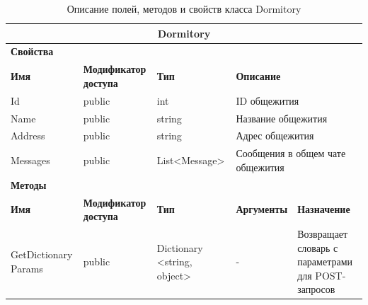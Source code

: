 \documentclass{../includes/TechDoc}
\begin{document}
    \begin{table}[ht]
        \caption{\label{tab:class-dormitory-table}Описание полей, методов и свойств класса Dormitory}
        \centering
        \begin{tabular}{|p{3cm}|p{3cm}|p{3cm}|p{2.6cm}|p{4cm}|}
            \hline
            \multicolumn{5}{|c|}{Dormitory} \\ \hline
            \multicolumn{5}{|l|}{\textbf{Свойства}} \\ \hline
            \textbf{Имя} & \textbf{Модификатор доступа} & \textbf{Тип} & \multicolumn{2}{p{6.9cm}|}{\textbf{Описание}} \\ \hline
            Id & public & int & \multicolumn{2}{p{6.9cm}|}{ID общежития} \\ \hline
            Name & public & string & \multicolumn{2}{p{6.9cm}|}{Название общежития} \\ \hline
            Address & public & string & \multicolumn{2}{p{6.9cm}|}{Адрес общежития} \\ \hline
            Messages & public & List<Message> & \multicolumn{2}{p{6.9cm}|}{Сообщения в общем чате общежития} \\ \hline
            \multicolumn{5}{|l|}{\textbf{Методы}} \\ \hline
            \textbf{Имя} & \textbf{Модификатор доступа} & \textbf{Тип} & \textbf{Аргументы} & \textbf{Назначение} \\ \hline
            GetDictionary Params & public & Dictionary <string, object> & - & Возвращает словарь с параметрами для POST-запросов \\ \hline
        \end{tabular}
    \end{table}
\end{document}
